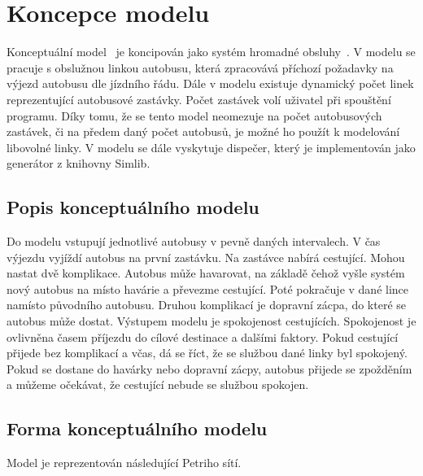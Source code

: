 \documentclass[a4paper]{article}
\begin{document}
    \section{Koncepce modelu}
    \label{sec:concept}

        Konceptuální model~\cite[snímek 48]{IMS_slides} je koncipován jako systém hromadné obsluhy~\cite[snímek 136]{IMS_slides}.
        V modelu se pracuje s obslužnou linkou autobusu, která zpracovává příchozí požadavky na výjezd autobusu dle jízdního řádu. Dále v modelu existuje dynamický počet linek reprezentující autobusové zastávky. Počet zastávek volí uživatel při spouštění programu. Díky tomu, že se tento model neomezuje na počet autobusových zastávek, či na předem daný počet autobusů, je možné ho použít k modelování libovolné linky. V modelu se dále vyskytuje dispečer, který je implementován jako generátor z knihovny Simlib.

        \subsection{Popis konceptuálního modelu}
        \label{subsec:conceptual_model_description}
            Do modelu vstupují jednotlivé autobusy v pevně daných intervalech. 
            V čas výjezdu vyjíždí autobus na první zastávku. Na zastávce nabírá cestující. Mohou nastat dvě komplikace. Autobus může havarovat, na základě čehož vyšle systém nový autobus na místo havárie a převezme cestující. Poté pokračuje v dané lince namísto původního autobusu. Druhou komplikací je dopravní zácpa, do které se autobus může dostat. Výstupem modelu je spokojenost cestujících. Spokojenost je ovlivněna časem příjezdu do cílové destinace a dalšími faktory. Pokud cestující přijede bez komplikací a včas, dá se říct, že se službou dané linky byl spokojený. Pokud se dostane do havárky nebo dopravní zácpy, autobus přijede se zpožděním a můžeme očekávat, že cestující nebude se službou spokojen.
            
        \subsection{Forma konceptuálního modelu}
        \label{subsec:conceptual_model}

            Model je reprezentován následující Petriho sítí.
\end{document}
